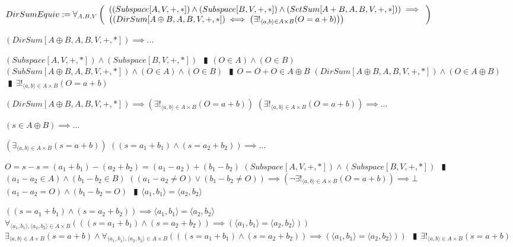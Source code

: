 \documentclass{book}
\newcommand{\abr}{:=}
\newcommand{\pipe}{$\phantom{(}\vrectangleblack\phantom{)}$}
\newcommand{\pr}[1]{\left(#1\right)}
\begin{document}
\begin{shaded}
  $DirSumEquiv \abr \forall_{A, B, V}\left(\begin{array}{ll}
    \pr{(Subspace[A, V, +, *]) \land (Subspace[B, V, +, *]) \land (SetSum[A + B, A, B, V, +, *])} \hfill \implies \hfill \\
    \pr{(DirSum[A \oplus B, A, B, V, +, *]) \iff \pr{\exists!_{\langle a, b \rangle \in A \times B}(O = a + b)}}
  \end{array}\right)$
  \begin{enumerate}
    \lit $(DirSum[A \oplus B, A, B, V, +, *]) \implies \ldots$
    \begin{enumerate}
      \lit $(Subspace[A, V, +, *]) \land (Subspace[B, V, +, *])$ \pipe $(O \in A) \land (O \in B)$
      \lit $(SubSum[A \oplus B, A, B, V, +, *]) \land (O \in A) \land (O \in B)$ \pipe $O = O + O \in A \oplus B$
      \lit $(DirSum[A \oplus B, A, B, V, +, *]) \land (O \in A \oplus B)$ \pipe $\exists!_{\langle a, b \rangle \in A \times B}(O = a + b)$
    \end{enumerate}
    \lit $(DirSum[A \oplus B, A, B, V, +, *]) \implies \pr{\exists!_{\langle a, b \rangle \in A \times B}(O = a + b)}$
    \lit $\pr{\exists!_{\langle a, b \rangle \in A \times B}(O = a + b)} \implies \ldots$
    \begin{enumerate}
      \lit $(s \in A \oplus B) \implies \ldots$
      \begin{enumerate}
        \lit $\pr{\exists_{\langle a, b \rangle \in A \times B}(s = a + b)}$
        \lit $\pr{(s = a_1 + b_1) \land (s = a_2 + b_2)} \implies \ldots$
        \begin{enumerate}
          \lit $O = s - s = (a_1 + b_1) - (a_2 + b_2) = (a_1 - a_2) + (b_1 - b_2)$
          \lit $(Subspace[A, V, +, *]) \land (Subspace[B, V, +, *])$ \pipe $(a_1 - a_2 \in A) \land (b_1 - b_2 \in B)$
          \lit $\pr{(a_1 - a_2 \neq O) \lor (b_1 - b_2 \neq O)} \implies \pr{\lnot \exists!_{\langle a, b \rangle \in A \times B}(O = a + b)} \implies \bot$
          \lit $(a_1 - a_2 = O) \land (b_1 - b_2 = O)$ \pipe $\langle a_1, b_1 \rangle = \langle a_2, b_2 \rangle$
        \end{enumerate}
        \lit $\pr{(s = a_1 + b_1) \land (s = a_2 + b_2)} \implies \langle a_1, b_1 \rangle = \langle a_2, b_2 \rangle$
        \lit $\forall_{\langle a_1, b_1 \rangle, \langle a_2, b_2 \rangle \in A \times B}\pr{\pr{(s = a_1 + b_1) \land (s = a_2 + b_2)} \implies (\langle a_1, b_1 \rangle = \langle a_2, b_2 \rangle)}$
        \lit $\exists_{\langle a, b \rangle \in A \times B}(s = a + b) \land \forall_{\langle a_1, b_1 \rangle, \langle a_2, b_2 \rangle \in A \times B}\pr{\pr{(s = a_1 + b_1) \land (s = a_2 + b_2)} \implies (\langle a_1, b_1 \rangle = \langle a_2, b_2 \rangle)}$ \pipe $\exists!_{\langle a, b \rangle \in A \times B}(s = a + b)$

\end{enumerate}
\end{enumerate}
\end{enumerate}
\end{shaded}
\end{document}
